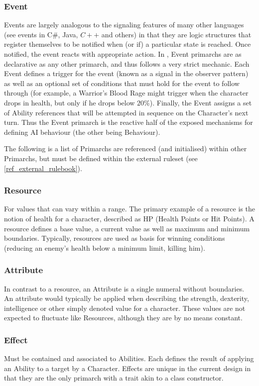 \subsubsection{Event}
Events are largely analogous to the signaling features of many other languages (see events in C\#, Java, $C++$ and others) in that they are logic structures that register themselves to be notified when (or if) a particular state is reached. Once notified, the event reacts with appropriate action. In \langname{}, Event primarchs are as declarative as any other primarch, and thus follows a very strict mechanic. Each Event defines a trigger for the event (known as a signal in the observer pattern) as well as an optional set of conditions that must hold for the event to follow through (for example, a Warrior's Blood Rage might trigger when the character drops in health, but only if he drops below $20\%$). Finally, the Event assigns a set of Ability references that will be attempted in sequence on the Character's next turn. Thus the Event primarch is the reactive half of the exposed mechanisms for defining AI behaviour (the other being Behaviour).

\noindent The following is a list of Primarchs are referenced (and initialised) within other Primarchs, but must be defined within the external ruleset (see \vref{ref_external_rulebook}).

\subsubsection{Resource}
For values that can vary within a range. The primary example of a resource is the notion of health for a character, described as HP (Health Points or Hit Points). A resource defines a base value, a current value as well as maximum and minimum boundaries. Typically, resources are used as basis for winning conditions (reducing an enemy's health below a minimum limit, killing him).

\subsubsection{Attribute} 
In contrast to a resource, an Attribute is a single numeral without boundaries. An attribute would typically be applied when describing the strength, dexterity, intelligence or other simply denoted value for a character. These values are not expected to fluctuate like Resources, although they are by no means constant.

\subsubsection{Effect}
Must be contained and associated to Abilities. Each defines the result of applying an Ability to a target by a Character. Effects are unique in the current design  in that they are the only primarch with a trait akin to a class constructor.

